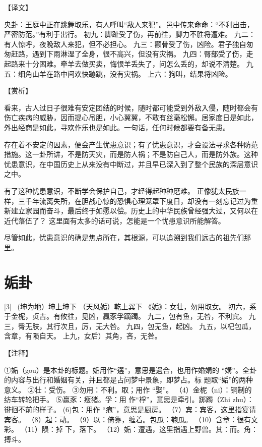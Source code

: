 \documentclass[12pt,UTF8]{ctexbook}
\begin{document}
【译文】

央卦：王庭中正在跳舞取乐，有人呼叫“敌人来犯”。邑中传来命命：“不利出击，严密防范。”有利于出行。
初九：脚趾受了伤，再前往，脚力不胜将遭难。
九二：有人惊呼，夜晚敌人来犯，但不必担心。
九三：颧骨受了伤，凶险。君子独自匆匆赶路，遇到下雨淋湿了全身，很不高兴，但没有灾祸。
九四：臀部受了伤，走起路来十分困难。牵羊去做买卖，悔恨羊丢失了，问怎么丢的，却说不清楚。
九五：细角山羊在路中间欢快蹦跳，没有灾祸。
上六：狗叫，结果将凶险。

【赏析】

看来，古人过日子很难有安定团结的时候，随时都可能受到外敌入侵，随时都会有伤亡疾病的威胁，因而提心吊胆，小心翼翼，不敢有丝毫松懈。居家度日是如此，外出经商是如此，寻欢作乐也是如此。一句话，任何时候都要有备无患。

存在着不安定的因素，便会产生忧患意识；有了忧患意识，才会设法寻求各种防范措施。这一卦所讲，不是防天灾，而是防人祸；不是防自己人，而是防外族。这种忧患意识，在中国历史上从来没有中断过，并且早已深入到了整个民族的深层意识之中。

有了这种忧患意识，不断学会保护自己，才经得起种种磨难。 正像犹太民族一样，三千年流离失所，在胆战心惊的恐惧心理笼罩下度日，却没有一刻忘记过为重新建立家园而奋斗，最后终于如愿以偿。历史上的中华民族曾经强大过，又何以在近代落伍了？ 这里面有太多的话可说，怎能是一个忧患意识所能解答。

尽管如此，忧患意识的确是焦点所在，其根源，可以追溯到我们远古的祖先们那里。

\chapter{姤卦}
[3] \ (坤为地）坤上坤下
（天风姤）乾上巽下
《姤》：女壮，勿用取女。
初六，系于金柅，贞吉。有攸往，见凶，羸豕孚蹢躅。
九二，包有鱼，无咎，不利宾。
九三，臀无肤，其行次且，厉，无大咎。
九四，包无鱼，起凶。
九五，以杞包瓜，含章，有陨自天。
上九，女后）其角，吝，无咎。

【注释】

①姤（gou）是本卦的标题。姤用作“遘”，意思是遇合，也用作婚媾的 “媾”。全卦的内容与出行和婚姻有关，并且都是占问梦中景象，即梦占。标 题取“姤”的两种意义。
②壮：受伤。
③勿用：不利。取；用作 “娶”。
（4）金柅（ni）：铜制的纺车转轮把手。
⑤赢豕：瘦猪。孚：用 作“桴”，意思是牵引。踯躅（Zhi zhu）：徘徊不前的样子。
(6)包：用作 “疱”，意思是厨房。
（7）宾：宾客，这里指宴请宾客。
（8）起：动。
（9）以：倚靠，缠着。包瓜：匏瓜。
（10）含章：很有文彩。
（11）陨：掉 下，落下。
（12）姤：遭遇，这里指遇上野兽。其：而。角：搏斗。
\end{document}
